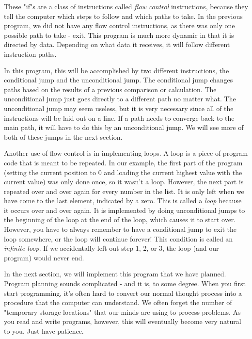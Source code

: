 These "if"s are a class of instructions called \emph{flow control} instructions, because they tell the computer which steps
to follow and which paths to take.  In the previous program, we did not
have any flow control instructions, as there was only one possible path to
take - exit.  This program is much more dynamic in that it is directed by
data.  Depending on what data it receives, it will follow different instruction
paths.

In this program, this will be accomplished by two different 
instructions, the conditional 
jump and the 
unconditional jump.
The conditional
jump changes paths based on the results of a previous comparison or
calculation.  The unconditional jump just goes directly to a different path
no matter what.  The unconditional jump may seem useless, but it is very
necessary since all of the instructions will be laid out on a line.  If a
path needs to converge back to the main path, it will have to do this by
an unconditional jump.  We will see more of both of these jumps in the
next section.

Another use of flow control is in implementing loops.  A loop is a piece
of program code that is meant to be repeated.  In our example, the first
part of the program (setting the current position to 0 and loading the
current highest value with the current value) was only done once, so it
wasn't a loop.  However, the next part is repeated over and over again
for every number in the list.  It is only left when we have come to the
last element, indicated by a zero.  This is called a \emph{loop}
because it occurs over and over again.  It is implemented by doing 
unconditional jumps to the beginning of the loop at the end of the loop, which
causes it to start over.  However, you have to always remember to have a
conditional jump to exit the loop somewhere, or the loop will continue
forever!  This condition is called an \emph{infinite loop}.
If we accidentally left out step 1, 2, or 3, the loop (and our program)
would never end.

In the next section, we will implement this program that we have planned.
Program planning sounds complicated - and it is, to some degree.  When you
first start programming, it's often hard to convert our normal thought
process into a procedure that the computer can understand.  We often forget
the number of "temporary storage locations" that our minds are using to
process problems.  As you read and write programs, however, this will
eventually become very natural to you.  Just have patience.

